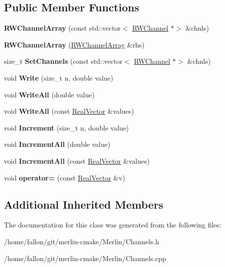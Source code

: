 \subsection*{Public Member Functions}
\begin{DoxyCompactItemize}
\item 
\mbox{\label{classRWChannelArray_a4b3521bf5f79240d86f2c230310bf805}} 
{\bfseries R\+W\+Channel\+Array} (const std\+::vector$<$ \hyperlink{classRWChannel}{R\+W\+Channel} $\ast$$>$ \&chnls)
\item 
\mbox{\label{classRWChannelArray_add933d9f0ee55a326d107bb0f1667017}} 
{\bfseries R\+W\+Channel\+Array} (\hyperlink{classRWChannelArray}{R\+W\+Channel\+Array} \&rhs)
\item 
\mbox{\label{classRWChannelArray_a021b876efe66d9d59c19540fd84ffe82}} 
size\+\_\+t {\bfseries Set\+Channels} (const std\+::vector$<$ \hyperlink{classRWChannel}{R\+W\+Channel} $\ast$$>$ \&chnls)
\item 
\mbox{\label{classRWChannelArray_a4e4e0e529e2bac69d9a173dfa4e36b2c}} 
void {\bfseries Write} (size\+\_\+t n, double value)
\item 
\mbox{\label{classRWChannelArray_a15bd35bdc6edec99d021c91ff7c047c6}} 
void {\bfseries Write\+All} (double value)
\item 
\mbox{\label{classRWChannelArray_a028a8261ce19da768788a6215f8261b2}} 
void {\bfseries Write\+All} (const \hyperlink{classTLAS_1_1Vector}{Real\+Vector} \&values)
\item 
\mbox{\label{classRWChannelArray_ad23a682047a4dd66cfbc5de5aaf55045}} 
void {\bfseries Increment} (size\+\_\+t n, double value)
\item 
\mbox{\label{classRWChannelArray_a29121b55143074523c68051c2408919c}} 
void {\bfseries Increment\+All} (double value)
\item 
\mbox{\label{classRWChannelArray_a939ccd1ca3e816438cddd3bca8871466}} 
void {\bfseries Increment\+All} (const \hyperlink{classTLAS_1_1Vector}{Real\+Vector} \&values)
\item 
\mbox{\label{classRWChannelArray_a1d3fc56e4c0234342c88acdd754954c0}} 
void {\bfseries operator=} (const \hyperlink{classTLAS_1_1Vector}{Real\+Vector} \&v)
\end{DoxyCompactItemize}
\subsection*{Additional Inherited Members}


The documentation for this class was generated from the following files\+:\begin{DoxyCompactItemize}
\item 
/home/fallon/git/merlin-\/cmake/\+Merlin/Channels.\+h\item 
/home/fallon/git/merlin-\/cmake/\+Merlin/Channels.\+cpp\end{DoxyCompactItemize}
